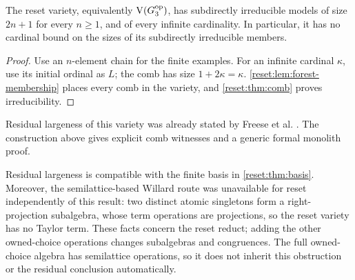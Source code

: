 \begin{corollary}\label{reset:cor:residual}
The reset variety, equivalently $\operatorname{V}(G_3^{\rm op})$, has
subdirectly irreducible models of size $2n+1$ for every $n\geq1$, and
of every infinite cardinality. In particular, it has no cardinal bound
on the sizes of its subdirectly irreducible members.
\end{corollary}
\begin{proof}
Use an $n$-element chain for the finite examples. For an infinite
cardinal $\kappa$, use its initial ordinal as $L$; the comb has size
$1+2\kappa=\kappa$. \cref{reset:lem:forest-membership} places every comb
in the variety, and \cref{reset:thm:comb} proves irreducibility.
\end{proof}

Residual largeness of this variety was already stated by Freese et al.
\cite[Section~3, before Theorem~3.2]{FreeseEtAl2002}. The construction
above gives explicit comb witnesses and a generic formal monolith proof.

Residual largeness is compatible with the finite basis in
\cref{reset:thm:basis}. Moreover, the semilattice-based Willard route
was unavailable for reset independently of this result: two distinct
atomic singletons form a right-projection subalgebra, whose term
operations are projections, so the reset variety has no Taylor term.
These facts concern the reset reduct; adding the other owned-choice
operations changes subalgebras and congruences. The full owned-choice
algebra has semilattice operations, so it does not inherit this
obstruction or the residual conclusion automatically.
